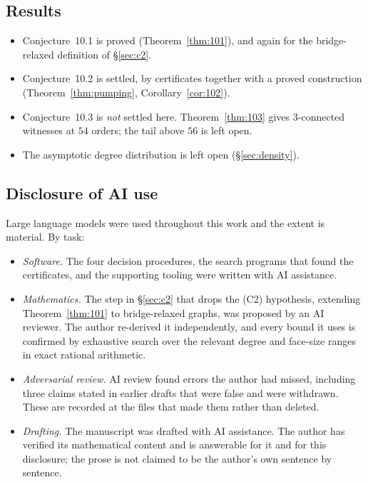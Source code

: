 \documentclass{baustms}
\theoremstyle{cupthm}
\theoremstyle{cupdefn}
\theoremstyle{cuprem}
\begin{document}
\subsection*{Results}

\begin{itemize}
  \item Conjecture~10.1 is proved (Theorem~\ref{thm:101}), and again for the
        bridge-relaxed definition of \S\ref{sec:c2}.
  \item Conjecture~10.2 is settled, by certificates together with a proved
        construction (Theorem~\ref{thm:pumping}, Corollary~\ref{cor:102}).
  \item Conjecture~10.3 is \emph{not} settled here. Theorem~\ref{thm:103}
        gives $3$-connected witnesses at $54$ orders; the tail above $56$ is
        left open.
  \item The asymptotic degree distribution is left open (\S\ref{sec:density}).
\end{itemize}

\subsection*{Disclosure of AI use}

Large language models were used throughout this work and the extent is
material. By task:

\begin{itemize}
\item \emph{Software.} The four decision procedures, the search programs that
  found the certificates, and the supporting tooling were written with AI
  assistance.
\item \emph{Mathematics.} The step in \S\ref{sec:c2} that drops the (C2)
  hypothesis, extending Theorem~\ref{thm:101} to bridge-relaxed graphs, was
  proposed by an AI reviewer. The author re-derived it independently, and every bound it
  uses is confirmed by exhaustive search over the relevant degree and face-size
  ranges in exact rational arithmetic.
\item \emph{Adversarial review.} AI review found errors the author had missed,
  including three claims stated in earlier drafts that were false and were
  withdrawn. These are recorded at the files that made them rather than deleted.
\item \emph{Drafting.} The manuscript was drafted with AI assistance. The author
  has verified its mathematical content and is answerable for it and for this
  disclosure; the prose is not claimed to be the author's own sentence by
  sentence.
\end{itemize}
\end{document}
